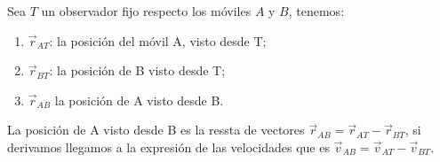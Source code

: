 Sea \(T\) un observador fijo respecto los móviles \(A\) y \(B\),
tenemos:
\begin{enumerate}
    \item \(\vec{r}_{AT}\): la posición del móvil A,
    visto desde T;
    \item \(\vec{r}_{BT}\): la posición de B visto desde T;
    \item \(\vec{r}_{AB}\) la posición de A visto desde B.
\end{enumerate}

La posición de A visto desde B es la ressta de vectores \(\vec{r}_{AB} = \vec{r}_{AT} - \vec{r}_{BT}\),
si derivamos llegamos a la expresión de las velocidades que es 
\(\vec{v}_{AB} = \vec{v}_{AT} - \vec{v}_{BT}\).

